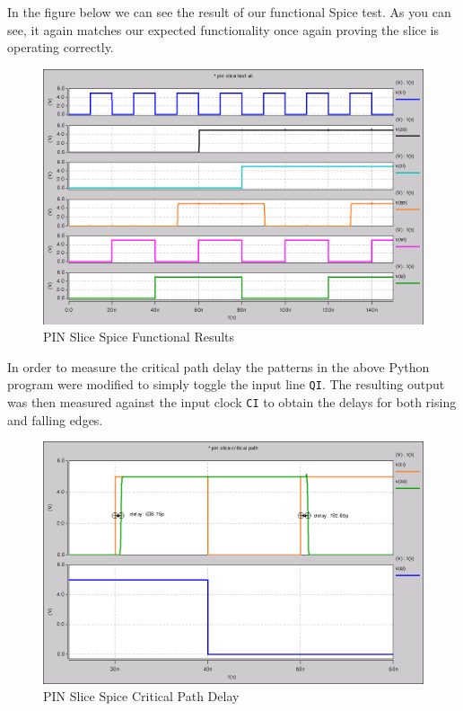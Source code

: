         

        In the figure below we can see the result of our functional Spice test.
        As you can see, it again matches our expected functionality once again
        proving the slice is operating correctly.

        \begin{figure}[H]
            \centering
            \includegraphics[width=0.65\linewidth]{../../spice/pin_slice_all.png}
            \caption{PIN Slice Spice Functional Results}
        \end{figure}

        \newpage

        In order to measure the critical path delay the patterns in the above
        Python program were modified to simply toggle the input line
        \texttt{QI}. The resulting output was then measured against the input
        clock \texttt{CI} to obtain the delays for both rising and falling
        edges.

        \begin{figure}[H]
            \centering
            \includegraphics[width=0.75\linewidth]{../../spice/pin_slice_crit_path.png}
            \caption{PIN Slice Spice Critical Path Delay}
        \end{figure}

